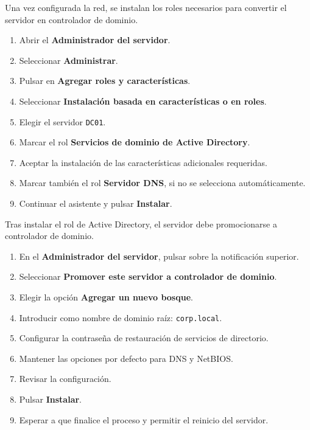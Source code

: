 
Una vez configurada la red, se instalan los roles necesarios para convertir el servidor en controlador de dominio.

\begin{tcolorbox}[
    enhanced,
    breakable,
    colback=black!3,
    colframe=black!15,
    boxrule=0.2pt,
    arc=2mm,
    left=4mm,
    right=4mm,
    top=2mm,
    bottom=2mm
]
\begin{enumerate}
    \item Abrir el \textbf{Administrador del servidor}.
    \item Seleccionar \textbf{Administrar}.
    \item Pulsar en \textbf{Agregar roles y características}.
    \item Seleccionar \textbf{Instalación basada en características o en roles}.
    \item Elegir el servidor \texttt{DC01}.
    \item Marcar el rol \textbf{Servicios de dominio de Active Directory}.
    \item Aceptar la instalación de las características adicionales requeridas.
    \item Marcar también el rol \textbf{Servidor DNS}, si no se selecciona automáticamente.
    \item Continuar el asistente y pulsar \textbf{Instalar}.
\end{enumerate}
\end{tcolorbox}


Tras instalar el rol de Active Directory, el servidor debe promocionarse a controlador de dominio.

\begin{tcolorbox}[
    enhanced,
    breakable,
    colback=black!3,
    colframe=black!15,
    boxrule=0.2pt,
    arc=2mm,
    left=4mm,
    right=4mm,
    top=2mm,
    bottom=2mm
]
\begin{enumerate}
    \item En el \textbf{Administrador del servidor}, pulsar sobre la notificación superior.
    \item Seleccionar \textbf{Promover este servidor a controlador de dominio}.
    \item Elegir la opción \textbf{Agregar un nuevo bosque}.
    \item Introducir como nombre de dominio raíz: \texttt{corp.local}.
    \item Configurar la contraseña de restauración de servicios de directorio.
    \item Mantener las opciones por defecto para DNS y NetBIOS.
    \item Revisar la configuración.
    \item Pulsar \textbf{Instalar}.
    \item Esperar a que finalice el proceso y permitir el reinicio del servidor.
\end{enumerate}
\end{tcolorbox}

